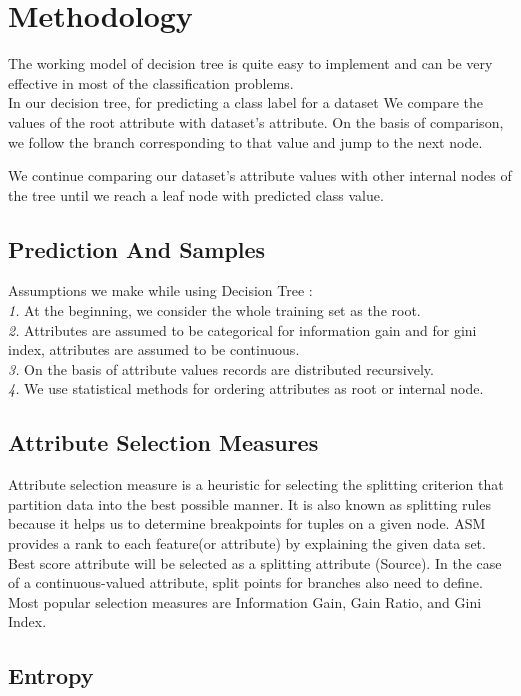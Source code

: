 \documentclass[conference,compsoc]{IEEEtran}
\begin{document}
\section{Methodology}


The working model of decision tree is quite easy to implement and can be very effective in most of the classification problems. \\
In our decision tree, for predicting a class label for a dataset We compare the values of the root attribute with dataset’s attribute. On the basis of comparison, we follow the branch corresponding to that value and jump to the next node.

We continue comparing our dataset’s attribute values with other internal nodes of the tree until we reach a leaf node with predicted class value.
\subsection{Prediction And Samples}
Assumptions we make while using Decision Tree :
\\ \textit{1.} At the beginning, we consider the whole training set as the root.
\\ \textit{2.} Attributes are assumed to be categorical for information gain and for gini index, attributes are assumed to be continuous.
\\ \textit{3.} On the basis of attribute values records are distributed recursively.
\\ \textit{4.} We use statistical methods for ordering attributes as root or internal node.

\subsection{Attribute Selection Measures}

Attribute selection measure is a heuristic for selecting the splitting criterion that partition data into the best possible manner. It is also known as splitting rules because it helps us to determine breakpoints for tuples on a given node. ASM provides a rank to each feature(or attribute) by explaining the given data set. Best score attribute will be selected as a splitting attribute (Source). In the case of a continuous-valued attribute, split points for branches also need to define. Most popular selection measures are Information Gain, Gain Ratio, and Gini Index.

\subsection{Entropy}
\end{document}
